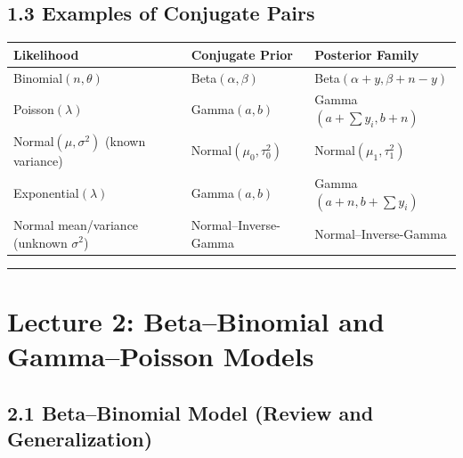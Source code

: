 \documentclass[
  letterpaper,
  DIV=11,
  numbers=noendperiod]{scrreprt}
\begin{document}
\subsection{1.3 Examples of Conjugate
Pairs}\label{examples-of-conjugate-pairs}

\begin{longtable}[]{@{}
  >{\raggedright\arraybackslash}p{}
  >{\raggedright\arraybackslash}p{}
  >{\raggedright\arraybackslash}p{}@{}}
\toprule\noalign{}
\begin{minipage}[b]{\linewidth}\raggedright
Likelihood
\end{minipage} & \begin{minipage}[b]{\linewidth}\raggedright
Conjugate Prior
\end{minipage} & \begin{minipage}[b]{\linewidth}\raggedright
Posterior Family
\end{minipage} \\
\midrule\noalign{}
\endhead
\bottomrule\noalign{}
\endlastfoot
Binomial\((n,\theta)\) & Beta\((\alpha,\beta)\) &
Beta\((\alpha+y, \beta+n-y)\) \\
Poisson\((\lambda)\) & Gamma\((a,b)\) & Gamma\((a+\sum y_i, b+n)\) \\
Normal\((\mu,\sigma^2)\) (known variance) & Normal\((\mu_0,\tau_0^2)\) &
Normal\((\mu_1,\tau_1^2)\) \\
Exponential\((\lambda)\) & Gamma\((a,b)\) &
Gamma\((a+n, b+\sum y_i)\) \\
Normal mean/variance (unknown \(\sigma^2\)) & Normal--Inverse-Gamma &
Normal--Inverse-Gamma \\
\end{longtable}

\begin{center}\rule{0.5\linewidth}{0.5pt}\end{center}

\section{Lecture 2: Beta--Binomial and Gamma--Poisson
Models}\label{lecture-2-betabinomial-and-gammapoisson-models}

\subsection{2.1 Beta--Binomial Model (Review and
Generalization)}\label{betabinomial-model-review-and-generalization}
\end{document}
